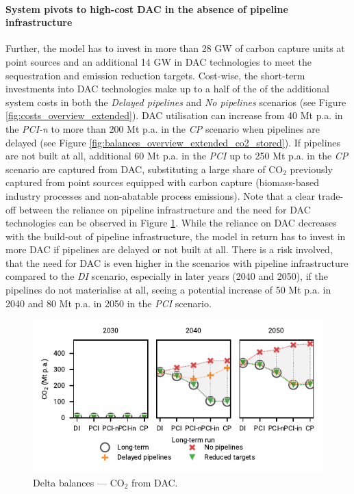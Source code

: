 \documentclass[pdflatex,sn-nature]{sn-jnl}
\theoremstyle{thmstyleone}%
\theoremstyle{thmstyletwo}%
\theoremstyle{thmstylethree}%
\begin{document}
\paragraph{System pivots to high-cost DAC in the absence of pipeline infrastructure}
Further, the model has to invest in more than 28 GW of carbon capture units at point sources and an additional 14 GW in DAC technologies to meet the sequestration and emission reduction targets. Cost-wise, the short-term investments into DAC technologies make up to a half of the of the additional system costs in both the \textit{Delayed pipelines} and \textit{No pipelines} scenarios (see Figure \ref{fig:costs_overview_extended}). DAC utilisation can increase from 40 Mt p.a. in the \textit{PCI-n} to more than 200 Mt p.a. in the \textit{CP} scenario when pipelines are delayed (see Figure \ref{fig:balances_overview_extended_co2_stored}). If pipelines are not built at all, additional 60 Mt p.a. in the \textit{PCI} up to 250 Mt p.a. in the \textit{CP} scenario are captured from DAC, substituting a large share of CO$_2$ previously captured from point sources equipped with carbon capture (biomass-based industry processes and non-abatable process emissions).
Note that a clear trade-off between the reliance on pipeline infrastructure and the need for DAC technologies can be observed in Figure \ref{fig:delta_balances_dac}. While the reliance on DAC decreases with the build-out of pipeline infrastructure, the model in return has to invest in more DAC if pipelines are delayed or not built at all. There is a risk involved, that the need for DAC is even higher in the scenarios with pipeline infrastructure compared to the \textit{DI} scenario, especially in later years (2040 and 2050), if the pipelines do not materialise at all, seeing a potential increase of 50 Mt p.a. in 2040 and 80 Mt p.a. in 2050 in the \textit{PCI} scenario.

\begin{figure}[htbp]
  \centering
  \includegraphics{figures/delta_balances_DAC}
  \caption{Delta balances --- CO$_2$ from DAC.}
  \label{fig:delta_balances_dac}
\end{figure}
\end{document}

